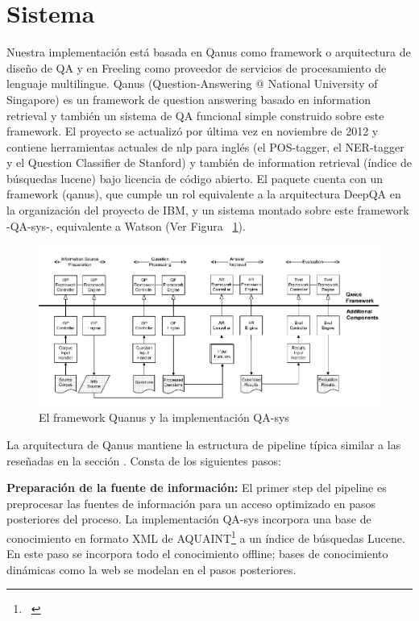 \section{Sistema}
\label{sec:sistema}
Nuestra implementación está basada en Qanus como framework o arquitectura de diseño de QA y en Freeling como proveedor de servicios de procesamiento de lenguaje multilingue. Qanus (Question-Answering @ National University of Singapore) es un framework de question answering basado en information retrieval y también un sistema de QA funcional simple construido sobre este framework. El proyecto se actualizó por última vez en noviembre de 2012 y contiene herramientas actuales de nlp para inglés (el POS-tagger, el NER-tagger y el Question Classifier de Stanford) y también de information retrieval (índice de búsquedas lucene) bajo licencia de código abierto. El paquete cuenta con un framework (qanus), que cumple un rol equivalente a la arquitectura DeepQA en la organización del proyecto de IBM, y un sistema montado sobre este framework -QA-sys-, equivalente a Watson (Ver Figura ~\ref{fig:Quanus}). 


\begin{figure}
  \centering
    \includegraphics{graficos/Quanus}
  \caption{El framework Quanus y la implementación QA-sys}
  \label{fig:Quanus}
\end{figure}


La arquitectura de Qanus mantiene la estructura de pipeline típica similar a las reseñadas en la sección . 
Consta de los siguientes pasos:

\textbf{Preparación de la fuente de información: } El primer step del pipeline es preprocesar las fuentes de información para un acceso optimizado en pasos posteriores del proceso. La implementación QA-sys incorpora una base de conocimiento en formato XML de AQUAINT\footnote{\ } a un índice de
búsquedas Lucene. En este paso se incorpora todo el conocimiento offline; bases de conocimiento dinámicas como la web se modelan en el pasos posteriores. \newline

